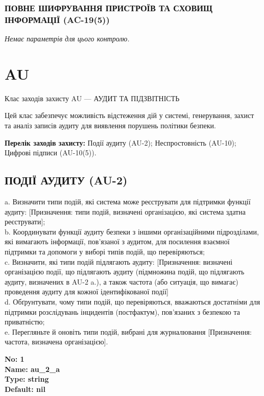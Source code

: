 \documentclass{article}
\begin{document}
\subsubsection{ПОВНЕ ШИФРУВАННЯ ПРИСТРОЇВ ТА СХОВИЩ ІНФОРМАЦІЇ (AC-19(5))}


\vspace{10pt}
\textit{Немає параметрів для цього контролю.}
\vspace{10pt}


\section{AU}
Клас заходів захисту AU --- АУДИТ ТА ПІДЗВІТНІСТЬ

Цей клас забезпечує можливість відстеження дій у системі, генерування, захист та аналіз записів аудиту для виявлення порушень політики безпеки.

\textbf{Перелік заходів захисту:} Події аудиту (AU-2); Неспростовність (AU-10); Цифрові підписи (AU-10(5)).

\subsection{ПОДІЇ АУДИТУ (AU-2)}
a. Визначити типи подій, які система може реєструвати для підтримки функції аудиту: [Призначення: типи подій, визначені організацією, які система здатна реєструвати];\\ 
b. Координувати функції аудиту безпеки з іншими організаційними підрозділами, які вимагають інформації, пов'язаної з аудитом, для посилення взаємної підтримки та допомоги у виборі типів подій, що перевіряються;\\ 
c. Визначити, які типи подій підлягають аудиту: [Призначення: визначені організацією події, що підлягають аудиту (підмножина подій, що підлягають аудиту, визначених в AU-2 a.), а також частота (або ситуація, що вимагає) проведення аудиту для кожної ідентифікованої події]\\ 
d. Обґрунтувати, чому типи подій, що перевіряються, вважаються достатніми для підтримки розслідувань інцидентів (постфактум), пов'язаних з безпекою та приватністю;\\ 
e. Перегляньте й оновіть типи подій, вибрані для журналювання [Призначення: частота, визначена організацією].

\vspace{10pt}
{\footnotesize\bfseries
No: 1\\
Name: au\_\allowbreak{}2\_\allowbreak{}a\\
Type: string\\
Default: nil
}
\end{document}
